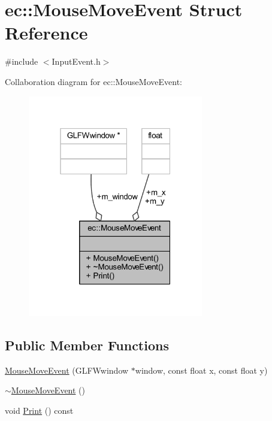 \hypertarget{structec_1_1_mouse_move_event}{}\section{ec\+:\+:Mouse\+Move\+Event Struct Reference}
\label{structec_1_1_mouse_move_event}


{\ttfamily \#include $<$Input\+Event.\+h$>$}



Collaboration diagram for ec\+:\+:Mouse\+Move\+Event\+:\nopagebreak
\begin{figure}[H]
\begin{center}
\leavevmode
\includegraphics[width=217pt]{structec_1_1_mouse_move_event__coll__graph}
\end{center}
\end{figure}
\subsection*{Public Member Functions}
\begin{DoxyCompactItemize}
\item 
\mbox{\hyperlink{structec_1_1_mouse_move_event_a3783a260f9b525df43a628cc2dff7611}{Mouse\+Move\+Event}} (G\+L\+F\+Wwindow $\ast$window, const float x, const float y)
\item 
\mbox{\hyperlink{structec_1_1_mouse_move_event_a9839ac53047ea0bcfd23010b66c9cef5}{$\sim$\+Mouse\+Move\+Event}} ()
\item 
void \mbox{\hyperlink{structec_1_1_mouse_move_event_ab45ddd0c88e0c5a669a99d755fac3e99}{Print}} () const
\end{DoxyCompactItemize}
